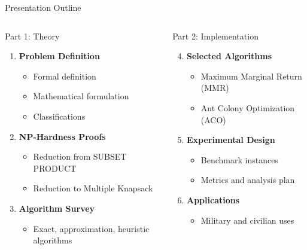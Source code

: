\documentclass[aspectratio=43,8pt]{beamer}
\begin{document}
\begin{frame}{Presentation Outline}
\begin{columns}[t]
\begin{block}{Part 1: Theory}
\begin{enumerate}
    \item \textbf{Problem Definition}
    \begin{itemize}
        \item Formal definition
        \item Mathematical formulation
        \item Classifications
    \end{itemize}
    \item \textbf{NP-Hardness Proofs}
    \begin{itemize}
        \item Reduction from SUBSET PRODUCT
        \item Reduction to Multiple Knapsack
    \end{itemize}
    \item \textbf{Algorithm Survey}
    \begin{itemize}
        \item Exact, approximation, heuristic algorithms
    \end{itemize}
\end{enumerate}
\end{block}

\begin{block}{Part 2: Implementation}
\begin{enumerate}
\setcounter{enumi}{3}
    \item \textbf{Selected Algorithms}
    \begin{itemize}
        \item Maximum Marginal Return (MMR)
        \item Ant Colony Optimization (ACO)
    \end{itemize}
    \item \textbf{Experimental Design}
    \begin{itemize}
        \item Benchmark instances
        \item Metrics and analysis plan
    \end{itemize}
    \item \textbf{Applications}
    \begin{itemize}
        \item Military and civilian uses
    \end{itemize}
\end{enumerate}
\end{block}
\end{columns}


\end{frame}
\end{document}
